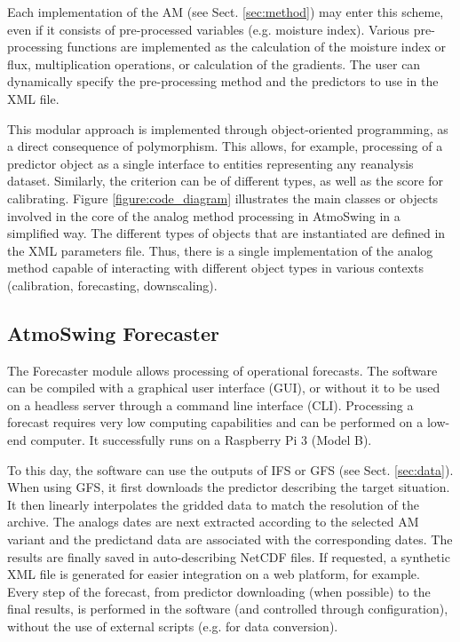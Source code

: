 \documentclass[gmd]{copernicus}
\begin{document}
Each implementation of the AM (see Sect. \ref{sec:method}) may enter this scheme, even if it consists of pre-processed variables (e.g. moisture index). Various pre-processing functions are implemented as the calculation of the moisture index or flux, multiplication operations, or calculation of the gradients. The user can dynamically specify the pre-processing method and the predictors to use in the XML file.

This modular approach is implemented through object-oriented programming, as a direct consequence of polymorphism. This allows, for example, processing of a predictor object as a single interface to entities representing any reanalysis dataset. Similarly, the criterion can be of different types, as well as the score for calibrating. Figure \ref{figure:code_diagram} illustrates the main classes or objects involved in the core of the analog method processing in AtmoSwing in a simplified way. The different types of objects that are instantiated are defined in the XML parameters file. Thus, there is a single implementation of the analog method capable of interacting with different object types in various contexts (calibration, forecasting, downscaling). 


\subsection{AtmoSwing Forecaster}
\label{sec:forecaster}

The Forecaster module allows processing of operational forecasts. The software can be compiled with a graphical user interface (GUI), or without it to be used on a headless server through a command line interface (CLI). Processing a forecast requires very low computing capabilities and can be performed on a low-end computer. It successfully runs on a Raspberry Pi 3 (Model B).

To this day, the software can use the outputs of IFS or GFS (see Sect. \ref{sec:data}). When using GFS, it first downloads the predictor describing the target situation. It then linearly interpolates the gridded data to match the resolution of the archive. The analogs dates are next extracted according to the selected AM variant and the predictand data are associated with the corresponding dates. The results are finally saved in auto-describing NetCDF files. If requested, a synthetic XML file is generated for easier integration on a web platform, for example. Every step of the forecast, from predictor downloading (when possible) to the final results, is performed in the software (and controlled through configuration), without the use of external scripts (e.g. for data conversion).
\end{document}

